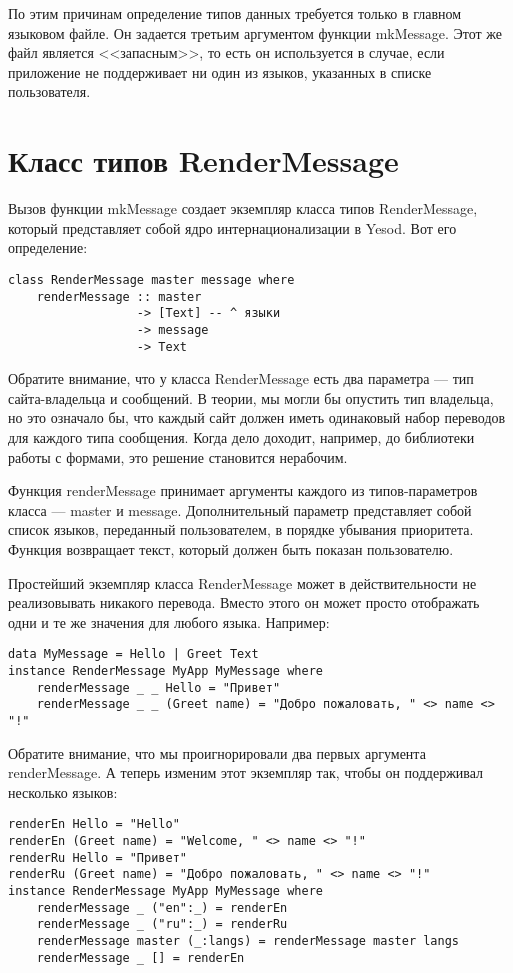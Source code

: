 По этим причинам определение типов данных требуется только в главном языковом файле. Он задается третьим аргументом функции mkMessage. Этот же файл является <<запасным>>, то есть он используется в случае, если приложение не поддерживает ни один из языков, указанных в списке пользователя.

\section{Класс типов RenderMessage} %

Вызов функции mkMessage создает экземпляр класса типов RenderMessage, который представляет собой ядро интернационализации в Yesod. Вот его определение:
\begin{lstlisting}
class RenderMessage master message where
    renderMessage :: master
                  -> [Text] -- ^ языки
                  -> message
                  -> Text 
\end{lstlisting}

Обратите внимание, что у класса RenderMessage есть два параметра --- тип сайта-владельца и сообщений. В теории, мы могли бы опустить тип владельца, но это означало бы, что каждый сайт должен иметь одинаковый набор переводов для каждого типа сообщения. Когда дело доходит, например, до библиотеки работы с формами, это решение становится нерабочим.

Функция renderMessage принимает аргументы каждого из типов-параметров класса --- master и message. Дополнительный параметр представляет собой список языков, переданный пользователем, в порядке убывания приоритета. Функция возвращает текст, который должен быть показан пользователю.

Простейший экземпляр класса RenderMessage может в действительности не реализовывать никакого перевода. Вместо этого он может просто отображать одни и те же значения для любого языка. Например:

\begin{lstlisting}
data MyMessage = Hello | Greet Text
instance RenderMessage MyApp MyMessage where
    renderMessage _ _ Hello = "Привет"
    renderMessage _ _ (Greet name) = "Добро пожаловать, " <> name <> "!"
\end{lstlisting}
    
Обратите внимание, что мы проигнорировали два первых аргумента renderMessage. А теперь изменим этот экземпляр так, чтобы он поддерживал несколько языков:

\begin{lstlisting}
renderEn Hello = "Hello"
renderEn (Greet name) = "Welcome, " <> name <> "!"
renderRu Hello = "Привет"
renderRu (Greet name) = "Добро пожаловать, " <> name <> "!"
instance RenderMessage MyApp MyMessage where
    renderMessage _ ("en":_) = renderEn
    renderMessage _ ("ru":_) = renderRu
    renderMessage master (_:langs) = renderMessage master langs
    renderMessage _ [] = renderEn
\end{lstlisting}

